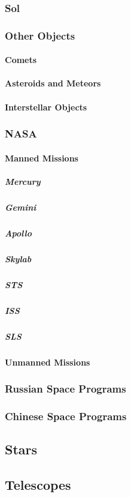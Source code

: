 \documentclass[12pt]{book}
\begin{document}
			\subsubsection{Sol}
			\subsubsection{Other Objects}
				\paragraph{Comets}
				\paragraph{Asteroids and Meteors}
				\paragraph{Interstellar Objects}
			
			\subsubsection{NASA}
				\paragraph{Manned Missions}
					\subparagraph{Mercury}
					\subparagraph{Gemini}
					\subparagraph{Apollo}
					\subparagraph{Skylab}
					\subparagraph{STS}
					\subparagraph{ISS}
					\subparagraph{SLS}
				\paragraph{Unmanned Missions}
				
			\subsubsection{Russian Space Programs}
			\subsubsection{Chinese Space Programs}
		\subsection{Stars}
		\subsection{Telescopes}
\end{document}
